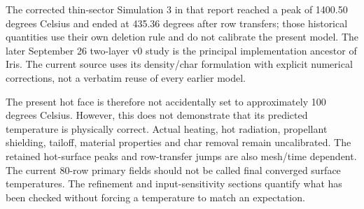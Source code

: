 \documentclass[oneside,openany]{amsdtx}
\begin{document}
The corrected thin-sector Simulation 3 in that report reached a peak of 1400.50 degrees Celsius and ended at 435.36 degrees after row transfers; those historical quantities use their own deletion rule and do not calibrate the present model. The later September 26 two-layer v0 study is the principal implementation ancestor of Iris. The current source uses its density/char formulation with explicit numerical corrections, not a verbatim reuse of every earlier model.

The present hot face is therefore not accidentally set to approximately 100 degrees Celsius. However, this does not demonstrate that its predicted temperature is physically correct. Actual heating, hot radiation, propellant shielding, tailoff, material properties and char removal remain uncalibrated. The retained hot-surface peaks and row-transfer jumps are also mesh/time dependent. The current 80-row primary fields should not be called final converged surface temperatures. The refinement and input-sensitivity sections quantify what has been checked without forcing a temperature to match an expectation.
\end{document}
